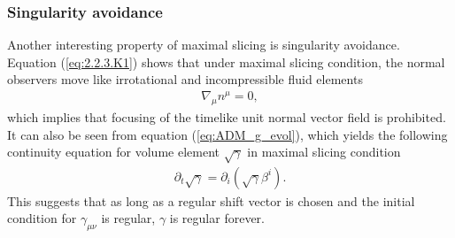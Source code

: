 \subsubsection{Singularity avoidance}
Another interesting property of maximal slicing is singularity avoidance.
Equation (\ref{eq:2.2.3.K1}) shows that under maximal slicing condition,
the normal observers move like irrotational and incompressible fluid elements
\begin{align}
    \nabla_\mu n^{\mu} = 0,
\end{align}
which implies that focusing of the timelike unit normal vector field is prohibited.
It can also be seen from equation (\ref{eq:ADM_g_evol}),
which yields the following continuity equation for volume element $\sqrt{\gamma}$ in maximal slicing condition
\begin{align}
    \partial_t \sqrt{\gamma} = \partial_i \left( \sqrt{\gamma} \beta^i \right).
\end{align}
This suggests that as long as a regular shift vector is chosen
and the initial condition for $\gamma_{\mu\nu}$ is regular,
$\gamma$ is regular forever.

